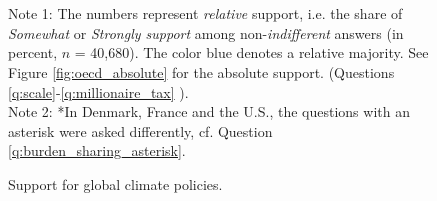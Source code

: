 \begin{bibunit}
\begin{figure}[h!]
  \caption[Relative support for global climate policies]{Support for global climate policies.} 
  \label{fig:oecd} %
  {\footnotesize \\ $\quad$ \\ Note 1: The numbers represent \textit{relative} support, i.e. the share of \textit{Somewhat} or \textit{Strongly support} among non-\textit{indifferent} answers (in percent, $n$ = 40,680). The color blue denotes a relative majority. See Figure \ref{fig:oecd_absolute} for the absolute support. (Questions \ref{q:scale}-\ref{q:millionaire_tax}%
). \\ Note 2: *In Denmark, France and the U.S., the questions with an asterisk were asked differently, cf. Question \ref{q:burden_sharing_asterisk}. } 
\end{figure}


\end{bibunit}
